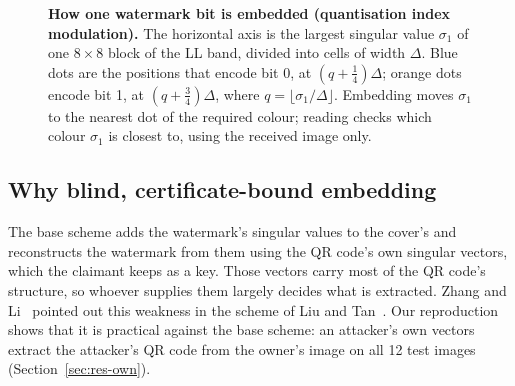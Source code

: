 \documentclass[11pt,a4paper]{article}
\begin{document}
\begin{figure}[!htbp]
\centering
{}
\caption{\textbf{How one watermark bit is embedded (quantisation index modulation).} The horizontal axis is the largest singular value $\sigma_1$ of one $8\times8$ block of the LL band, divided into cells of width $\Delta$. Blue dots are the positions that encode bit 0, at $(q+\tfrac14)\Delta$; orange dots encode bit 1, at $(q+\tfrac34)\Delta$, where $q=\lfloor\sigma_1/\Delta\rfloor$. Embedding moves $\sigma_1$ to the nearest dot of the required colour; reading checks which colour $\sigma_1$ is closest to, using the received image only.}
\label{fig:qim-concept}
\end{figure}

\subsection{Why blind, certificate-bound embedding}\label{sec:intro-why}

The base scheme adds the watermark's singular values to the cover's and reconstructs the watermark from them using the QR code's own singular vectors, which the claimant keeps as a key. Those vectors carry most of the QR code's structure, so whoever supplies them largely decides what is extracted. Zhang and Li~\cite{zhang2005comments} pointed out this weakness in the scheme of Liu and Tan~\cite{liu2002svd}. Our reproduction shows that it is practical against the base scheme: an attacker's own vectors extract the attacker's QR code from the owner's image on all 12 test images (Section~\ref{sec:res-own}).
\end{document}

